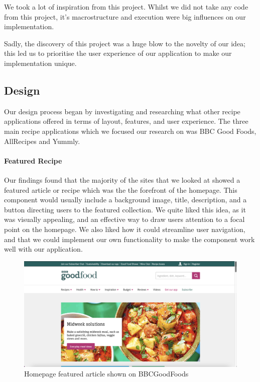 \documentclass{article}
\begin{document}
We took a lot of inspiration from this project. Whilst we did not take any code
from this project, it's macrostructure and execution were big influences on our
implementation.

Sadly, the discovery of this project was a huge blow to the novelty of our
idea; this led us to prioritise the user experience of our application to make
our implementation unique.

\subsection{Design}
Our design process began by investigating and researching what other recipe
applications offered in terms of layout, features, and user experience. The
three main recipe applications which we focused our research on was BBC Good
Foods, AllRecipes and Yummly.

\paragraph{Featured Recipe}
Our findings found that the majority of the sites that we looked at showed a
featured article or recipe which was the the forefront of the homepage. This
component would usually include a background image, title, description, and a
button directing users to the featured collection. We quite liked this idea, as
it was visually appealing, and an effective way to draw users attention to a
focal point on the homepage. We also liked how it could streamline user
navigation, and that we could implement our own functionality to make the
component work well with our application.

\begin{figure}[h]
  \includegraphics[width=1.0\textwidth]{assets/design-images/BBCGF featured-image.png}
  \centering
  \caption{Homepage featured article shown on BBCGoodFoods}
\end{figure}
\end{document}
